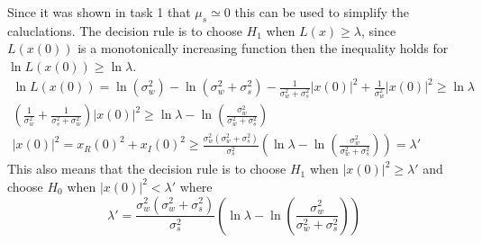 Since it was shown in task 1 that $\mu_s \simeq 0$ this can be used to simplify the caluclations. The decision rule is to choose $H_1$ when $L(x) \geq \lambda$, since $L(x(0))$ is a monotonically increasing function then the inequality holds for $\ln L(x(0)) \geq \ln\lambda$.
\begin{align}
    \ln L(x(0)) = \ln (\sigma_w^2)-\ln (\sigma_w^2+\sigma_s^2)-\frac{1}{\sigma_w^2+\sigma_s^2}|x(0)|^2+\frac{1}{\sigma_w^2}|x(0)|^2 \geq \ln\lambda\nonumber\\
    (\frac{1}{\sigma_w^2}+\frac{1}{\sigma_s^2+\sigma_w^2})|x(0)|^2 \geq \ln\lambda-\ln (\frac{\sigma_w^2}{\sigma_w^2+\sigma_s^2})\nonumber\\
    |x(0)|^2 = x_R(0)^2+x_I(0)^2 \geq \frac{\sigma_w^2(\sigma_w^2+\sigma_s^2)}{\sigma_s^2}(\ln\lambda-\ln (\frac{\sigma_w^2}{\sigma_w^2+\sigma_s^2})) = \lambda'\nonumber
\end{align}
This also means that the decision rule is to choose $H_1$ when $|x(0)|^2\geq\lambda'$ and choose $H_0$ when $|x(0)|^2<\lambda'$ where
\begin{equation}
    \lambda' = \frac{\sigma_w^2(\sigma_w^2+\sigma_s^2)}{\sigma_s^2}(\ln\lambda-\ln (\frac{\sigma_w^2}{\sigma_w^2+\sigma_s^2}))
\end{equation}\label{eq:lambda_prime}
